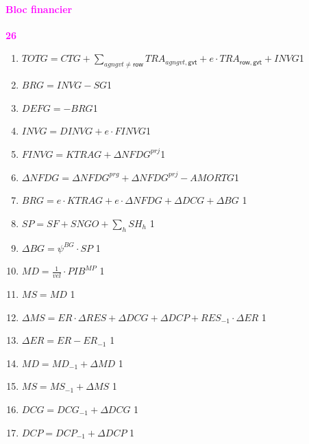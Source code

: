 \documentclass[11pt,a4paper]{article}
\newcommand{\agngvt}{\mathit{agngvt}}
\newcommand{\gvt}{\mathsf{gvt}}
\newcommand{\row}{\mathsf{row}}
\newcommand{\vel}{\mathit{vel}}
\newcommand{\AMORTG}{\mathit{AMORTG}}
\newcommand{\BG}{\mathit{BG}}
\newcommand{\BRG}{\mathit{BRG}}
\newcommand{\CTG}{\mathit{CTG}}
\newcommand{\DCG}{\mathit{DCG}}
\newcommand{\DCP}{\mathit{DCP}}
\newcommand{\DEFG}{\mathit{DEFG}}
\newcommand{\DINVG}{\mathit{DINVG}}
\newcommand{\ER}{\mathit{ER}}
\newcommand{\FINVG}{\mathit{FINVG}}
\newcommand{\INVG}{\mathit{INVG}}
\newcommand{\KTRAG}{\mathit{KTRAG}}
\newcommand{\MD}{\mathit{MD}}
\newcommand{\MS}{\mathit{MS}}
\newcommand{\NFDG}{\mathit{NFDG}}
\newcommand{\PIB}{\mathit{PIB}}
\newcommand{\RES}{\mathit{RES}}
\newcommand{\SF}{\mathit{SF}}
\newcommand{\SG}{\mathit{SG}}
\newcommand{\SH}{\mathit{SH}}
\newcommand{\SNGO}{\mathit{SNGO}}
\newcommand{\SP}{\mathit{SP}}
\newcommand{\TOTG}{\mathit{TOTG}}
\newcommand{\TRA}{\mathit{TRA}}
\newcommand{\redparagraph}[1]{\paragraph*{\large\textcolor{Fuchsia}{#1}}}
\begin{document}
	
	\redparagraph{Bloc financier}\hfill \textcolor{Fuchsia}{\textbf{26}} 
	\begin{enumerate}[itemsep=2pt,label=\textbf{eqfin\arabic*}.,  ref=\textbf{eqfin\arabic*}]
		
		\item $\TOTG = \CTG  + \sum_{\agngvt\neq\row} \TRA_{\agngvt,\gvt} + e\cdot\TRA_{\row,\gvt} + \INVG$\hfill 1
		
		\item $\BRG = \INVG - \SG $\hfill 1
		
		\item $\DEFG = - \BRG $\hfill 1
		
		\item $\INVG = \DINVG + e\cdot\FINVG $\hfill 1
		
		\item $\FINVG = \KTRAG + \Delta\NFDG^{\mathit{prj}} $\hfill 1
		
		\item $\Delta\NFDG = \Delta\NFDG^{\mathit{prg}} + \Delta\NFDG^{\mathit{prj}} -\AMORTG$\hfill 1
		
		\item $\BRG = e\cdot\KTRAG + e\cdot\Delta\NFDG + \Delta\DCG + \Delta\BG$ \hfill 1
		
		\item $\SP = \SF + \SNGO + \sum_{h} \SH_h$ \hfill 1
		
		\item $\Delta\BG = \psi^{\BG}\cdot \SP$ \hfill 1
		
		\item $\MD = \frac{1}{\vel}\cdot \PIB^{\textit{MP}}$ \hfill 1
		
		\item $\MS = \MD$	\hfill 1
		
		\item $\Delta\MS  = \ER\cdot \Delta \RES + \Delta\DCG + \Delta\DCP + \RES_{-1}\cdot\Delta\ER$ \hfill 1	
		
		\item $\Delta\ER  = \ER -\ER_{-1}$ \hfill 1				
		
		\item $\MD  = \MD_{-1} + \Delta \MD$ \hfill 1				
		
		\item $\MS  = \MS_{-1} + \Delta \MS$ \hfill 1	
		
		\item $\DCG  = \DCG_{-1} + \Delta \DCG$ \hfill 1		
		
		\item $\DCP  = \DCP_{-1} + \Delta \DCP$ \hfill 1												
		

\end{enumerate}
\end{document}
